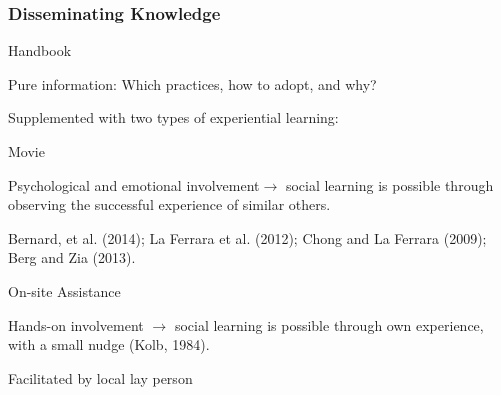 \documentclass[hideothersubsections, usenames,dvipsnames,11pt]{beamer}
\newenvironment{itemize_3pt}{\itemize\addtolength{\itemsep}{3pt}}{\enditemize}
\begin{document}
%
\begin{frame}
\frametitle{Disseminating Knowledge}
		\begin{itemize_3pt}
		\item \textcolor{bdf}{Handbook}
			\begin{itemize_3pt}
			\item \textcolor{bdf}{Pure information}: Which practices, how to adopt, and why?\\
			\end{itemize_3pt}
\bigskip
Supplemented with two types of experiential learning:
\bigskip
		\item \textcolor{bdf}{Movie}
			\begin{itemize_3pt}
			\item \textcolor{bdf}{Psychological and emotional involvement}$\rightarrow$ social learning is possible through \textcolor{bdf}{observing the successful experience of similar others}.
			\item Bernard, et al. (2014); La Ferrara et al. (2012); Chong and La Ferrara (2009); Berg and Zia (2013).\\
			\end{itemize_3pt}

\bigskip
		\item \textcolor{bdf}{On-site Assistance}
			\begin{itemize_3pt}
			\item \textcolor{bdf}{Hands-on involvement} $\rightarrow$ social learning is possible through own \textcolor{bdf}{experience, with a small nudge} (Kolb, 1984).
			\item Facilitated by local lay person
			\end{itemize_3pt}
			\vspace{0.05in}
		\end{itemize_3pt}

\end{frame}
\end{document}
